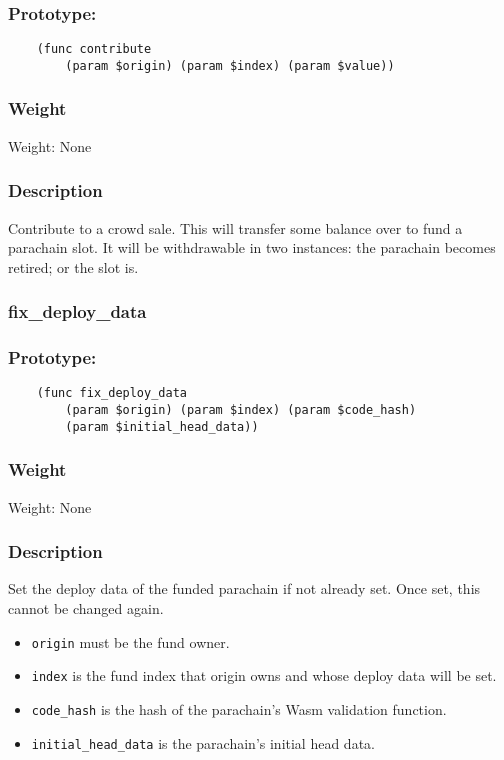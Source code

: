 \documentclass[11pt,a4paper]{article}
\begin{document}
\subsubsection*{Prototype:}
\begin{verbatim}
    (func contribute
        (param $origin) (param $index) (param $value))
\end{verbatim}
\subsubsection*{Weight}
Weight: None
\subsubsection*{Description}
Contribute to a crowd sale. This will transfer some balance over to fund a parachain slot. It will be withdrawable in two instances: the parachain becomes retired; or the slot is.

\subsubsection{fix\_deploy\_data}
\subsubsection*{Prototype:}
\begin{verbatim}
    (func fix_deploy_data
        (param $origin) (param $index) (param $code_hash)
        (param $initial_head_data))
\end{verbatim}
\subsubsection*{Weight}
Weight: None
\subsubsection*{Description}
Set the deploy data of the funded parachain if not already set. Once set, this cannot be changed again.

\begin{itemize}
\item \verb|origin| must be the fund owner.
\item \verb|index| is the fund index that origin owns and whose deploy data will be set.
\item \verb|code_hash| is the hash of the parachain's Wasm validation function.
\item \verb|initial_head_data| is the parachain's initial head data.
\end{itemize}
\end{document}
